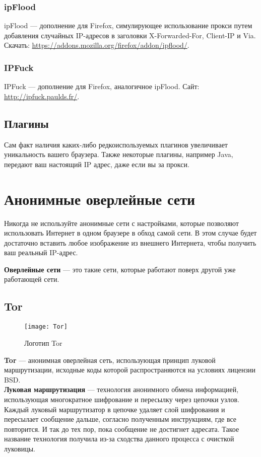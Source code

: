 \subsubsection{ipFlood}
ipFlood --- дополнение для Firefox, симулирующее использование прокси путем добавления случайных IP-адресов в заголовки X-Forwarded-For, Client-IP и Via. Скачать: \url{https://addons.mozilla.org/firefox/addon/ipflood/}.
\subsubsection{IPFuck}
IPFuck --- дополнение для Firefox, аналогичное ipFlood. Сайт: \url{http://ipfuck.paulds.fr/}.
\subsection{Плагины}
Сам факт наличия каких-либо редкоиспользуемых плагинов увеличивает уникальность вашего браузера. Также некоторые плагины, например Java, передают ваш настоящий IP адрес, даже если вы за прокси.

\section{Анонимные оверлейные сети}
\begin{important}
Никогда не используйте анонимные сети с настройками, которые позволяют использовать Интернет в одном браузере в обход самой сети. В этом случае будет достаточно вставить любое изображение из внешнего Интернета, чтобы получить ваш реальный IP-адрес.
\end{important}
\textbf{Оверлейные сети} --- это такие сети, которые работают поверх другой уже работающей сети.
\subsection{Tor}
\begin{wrapfigure}[9]{r}{0.25\linewidth}
\texttt{[image: Tor]}
\caption{Логотип Tor}
\end{wrapfigure}
\textbf{Tor} --- анонимная оверлейная сеть, использующая принцип луковой маршрутизации, исходные коды которой распространяются на условиях лицензии BSD\cite{tor_license}.\\
\textbf{Луковая маршрутизация} --- технология анонимного обмена информацией, использующая многократное шифрование и пересылку через цепочки узлов. Каждый луковый маршрутизатор в цепочке удаляет слой шифрования и пересылает сообщение дальше, согласно полученным инструкциям, где все повторится. И так до тех пор, пока сообщение не достигнет адресата. Такое название технология получила из-за сходства данного процесса с очисткой луковицы.\\
